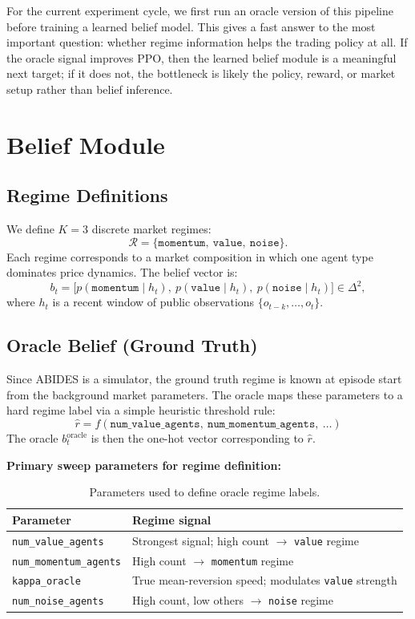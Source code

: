 \documentclass[11pt]{article}
\begin{document}
For the current experiment cycle, we first run an oracle version of this pipeline before training a
learned belief model. This gives a fast answer to the most important question: whether regime
information helps the trading policy at all. If the oracle signal improves PPO, then the learned
belief module is a meaningful next target; if it does not, the bottleneck is likely the policy,
reward, or market setup rather than belief inference.

\section{Belief Module}
\label{sec:belief}

\subsection{Regime Definitions}

We define $K = 3$ discrete market regimes:
\[
\mathcal{R} = \{\texttt{momentum},\ \texttt{value},\ \texttt{noise}\}.
\]
Each regime corresponds to a market composition in which one agent type dominates price dynamics.
The belief vector is:
\[
b_t = \bigl[p(\texttt{momentum} \mid h_t),\ p(\texttt{value} \mid h_t),\ p(\texttt{noise} \mid h_t)\bigr] \in \Delta^2,
\]
where $h_t$ is a recent window of public observations $\{o_{t-k}, \ldots, o_t\}$.

\subsection{Oracle Belief (Ground Truth)}

Since ABIDES is a simulator, the ground truth regime is known at episode start from the background
market parameters. The oracle maps these parameters to a hard regime label via a simple heuristic
threshold rule:
\[
\hat{r} = f(\texttt{num\_value\_agents},\ \texttt{num\_momentum\_agents},\ \ldots)
\]
The oracle $b_t^{\text{oracle}}$ is then the one-hot vector corresponding to $\hat{r}$.

\textbf{Primary sweep parameters for regime definition:}

\begin{table}[h]
\centering
\begin{tabular}{ll}
\toprule
\textbf{Parameter} & \textbf{Regime signal} \\
\midrule
\texttt{num\_value\_agents} & Strongest signal; high count $\to$ \texttt{value} regime \\
\texttt{num\_momentum\_agents} & High count $\to$ \texttt{momentum} regime \\
\texttt{kappa\_oracle} & True mean-reversion speed; modulates \texttt{value} strength \\
\texttt{num\_noise\_agents} & High count, low others $\to$ \texttt{noise} regime \\
\bottomrule
\end{tabular}
\caption{Parameters used to define oracle regime labels.}
\end{table}
\end{document}
